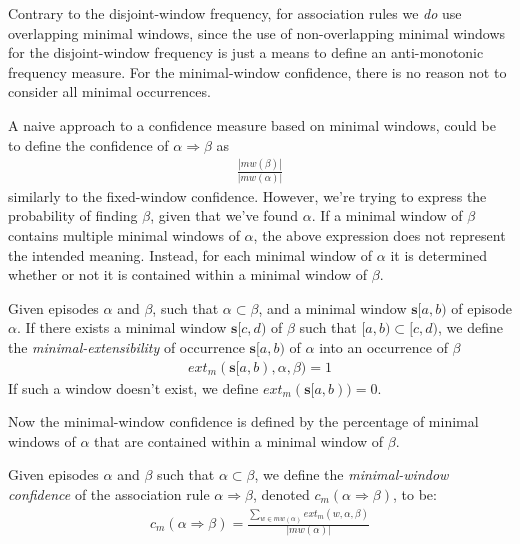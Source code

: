 Contrary to the disjoint-window frequency, for association rules we \emph{do} use overlapping minimal windows, since the use of non-overlapping minimal windows for the disjoint-window frequency is just a means to define an anti-monotonic frequency measure. For the minimal-window confidence, there is no reason not to consider all minimal occurrences.

A naive approach to a confidence measure based on minimal windows, could be to define the confidence of $ \alpha \Rightarrow \beta $ as
\begin{align*}
\frac{| mw(\beta) |}{| mw(\alpha) |}
\end{align*}
similarly to the fixed-window confidence. However, we're trying to express the probability of finding $ \beta $, given that we've found $ \alpha $. If a minimal window of $ \beta $ contains multiple minimal windows of $ \alpha $, the above expression does not represent the intended meaning. Instead, for each minimal window of $ \alpha $ it is determined whether or not it is contained within a minimal window of $ \beta $.

\begin{definition}
Given episodes $ \alpha $ and $ \beta $, such that $ \alpha \subset \beta $, and a minimal window $ \boldsymbol{s}[a, b) $ of episode $ \alpha $. If there exists a minimal window $ \boldsymbol{s}[c, d) $ of $ \beta $ such that
$ [a, b) \subset [c, d) $, we define the \emph{minimal-extensibility} of occurrence $ \boldsymbol{s}[a, b) $ of $ \alpha $ into an occurrence of $ \beta $
\begin{align*}
ext_m(\boldsymbol{s}[a, b), \alpha, \beta) = 1
\end{align*}
If such a window doesn't exist, we define $ ext_m(\boldsymbol{s}[a,b)) = 0 $.
\end{definition}

Now the minimal-window confidence is defined by the percentage of minimal windows of $ \alpha $ that are contained within a minimal window of $ \beta $.

\begin{definition}
Given episodes $ \alpha $ and $ \beta $ such that $ \alpha \subset \beta $, we define the \emph{minimal-window confidence} of the association rule $ \alpha \Rightarrow \beta $, denoted $ c_m(\alpha \Rightarrow \beta) $, to be:
\begin{align*}
c_m(\alpha \Rightarrow \beta) = \frac{\sum_{w \in mw(\alpha)} ext_m(w, \alpha, \beta)}{| mw(\alpha) |}
\end{align*}
\end{definition}

